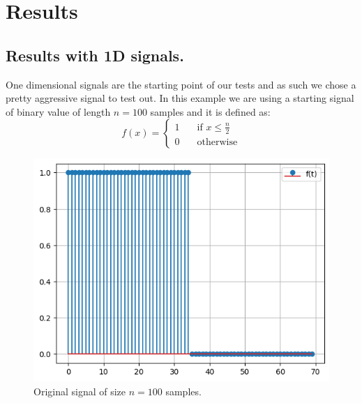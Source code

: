 \documentclass[]{usiinfbachelorproject}
\begin{document}
		\newpage
		\section{Results}
		\subsection{Results with 1D signals.}
		One dimensional signals are the starting point of our tests and as such we chose a pretty aggressive signal to test out. In this example we are using a starting signal of binary value of length $n=100$ samples and it is defined as:
		\begin{equation*}
			f(x) = 
			\begin{cases}
				1	& \quad \text{if } x \leq \frac{n}{2}\\
				0	& \quad \text{otherwise}
			\end{cases}
		\end{equation*}
		\begin{figure}[h]
			\centering
			\includegraphics[width=0.4\columnwidth]{images/original_signal.png}
			\caption{Original signal of size $n=100$ samples.}
			\label{original_signal}
		\end{figure}
		
\end{document}
